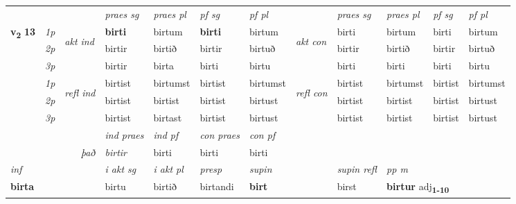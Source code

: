 \begin{longtable}[l]{X>{\footnotesize\itshape}llXXXXlXXXX}
 & &   & \textit{praes sg}  & \textit{praes pl}    & \textit{ pf sg} & \textit{pf pl} & & \textit{praes sg}  & \textit{praes pl}    & \textit{pf sg} & \textit{pf pl }  \\ \cmidrule{4-7} \cmidrule{9-12}
 \multirow{2}{*}{{{\textbf{v{\textsubscript{2}}} \Large{\textbf{13}}}}}  & 1p & \multirow{3}{*}{\begin{turn}{90}\textit{akt ind}\end{turn}} & \textbf{birti} & birtum & \textbf{birti} & birtum & \multirow{3}{*}{\begin{turn}{90}\textit{akt con}\end{turn}} &birti & birtum & birti & birtum\\*
 & 2p &  &  birtir  & birtið & birtir & birtuð & & birtir & birtið & birtir & birtuð \\*
 & 3p &  & birtir & birta & birti & birtu & & birti & birti& birti & birtu \\*
\cmidrule{4-7} \cmidrule{9-12}
 & 1p & \multirow{3}{*}{\begin{turn}{90}\textit{refl ind}\end{turn}}  & birtist & birtumst & birtist & birtumst & \multirow{3}{*}{\begin{turn}{90}\textit{refl con}\end{turn}}  &birtist & birtumst & birtist & birtumst \\*
 & 2p &  & birtist & birtist & birtist & birtust & &birtist & birtist & birtist & birtust \\*
 & 3p  & & birtist & birtast & birtist & birtust & & birtist & birtist& birtist & birtust \\*
\cmidrule{4-7} \cmidrule{9-12}

   && &  \textit{ind praes} & \textit{ind pf} & \textit{con praes} & \textit{con pf} \\*
\multicolumn{3}{r}{\textit{það}} & birtir & birti & birti & birti \\*

\cmidrule{4-7}
   {\textit{inf}} & &  & \textit{i akt sg} & \textit{i akt pl}   & \textit{presp} & \textit{supin} && \textit{supin refl} & \textit{pp m} \\*
  {\textbf{birta}} & && birtu  & birtið   & birtandi &  \textbf{birt} && birst & \multicolumn{2}{l}{\textbf{birtur} adj\textbf{\textsubscript{1-10}}} \\*

\midrule


\end{longtable}
